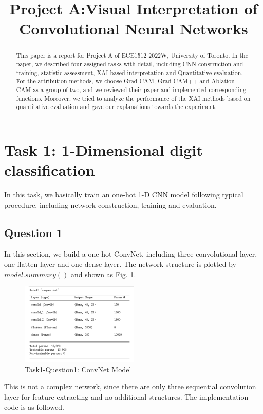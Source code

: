 \documentclass[conference]{IEEEtran}
\begin{document}
\title{Project A:Visual Interpretation of Convolutional Neural Networks}

\begin{abstract}
This paper is a report for Project A of ECE1512 2022W, University of Toronto. In the paper, we described four assigned tasks with detail, including CNN construction and training, statistic assessment, XAI based interpretation and Quantitative evaluation. For the attribution methods, we choose Grad-CAM, Grad-CAM++ and Ablation-CAM as a group of two, and we reviewed their paper and implemented corresponding functions. Moreover, we tried to analyze the performance of the XAI methods based on quantitative evaluation and gave our explanations towards the experiment.
\end{abstract}

\section{Task 1: 1-Dimensional digit classification}

In this task, we basically train an one-hot 1-D CNN model following typical procedure, including network construction, training and evaluation.

\subsection{Question 1}

In this section, we build a one-hot ConvNet, including three convolutional layer, one flatten layer and one dense layer.
The network structure is plotted by $model.summary()$ and shown as Fig. 1.

\begin{figure}[h] 
    \centering
    \includegraphics[width=0.5\textwidth]{T1Q1.png}
    \caption{Task1-Question1: ConvNet Model}
    \label{Fig.t1q1}
\end{figure}

This is not a complex network, since there are only three sequential convolution layer for feature extracting and no additional structures. The implementation code is as followed.
\end{document}
